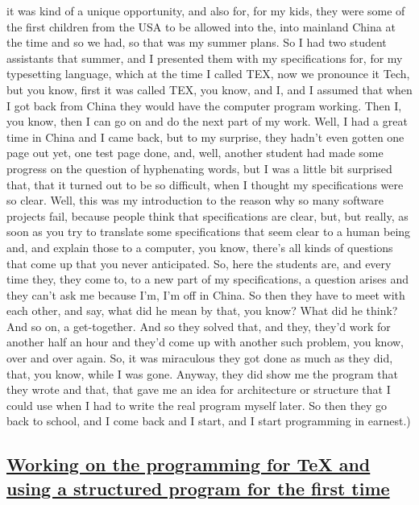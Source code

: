 \documentclass[]{article}
\begin{document}
it was kind of a unique opportunity, and also for, for my kids, they
were some of the first children from the USA to be allowed into the,
into mainland China at the time and so we had, so that was my summer
plans. So I had two student assistants that summer, and I presented them
with my specifications for, for my typesetting language, which at the
time I called TEX, now we pronounce it Tech, but you know, first it was
called TEX, you know, and I, and I assumed that when I got back from
China they would have the computer program working. Then I, you know,
then I can go on and do the next part of my work. Well, I had a great
time in China and I came back, but to my surprise, they hadn't even
gotten one page out yet, one test page done, and, well, another student
had made some progress on the question of hyphenating words, but I was a
little bit surprised that, that it turned out to be so difficult, when I
thought my specifications were so clear. Well, this was my introduction
to the reason why so many software projects fail, because people think
that specifications are clear, but, but really, as soon as you try to
translate some specifications that seem clear to a human being and, and
explain those to a computer, you know, there's all kinds of questions
that come up that you never anticipated. So, here the students are, and
every time they, they come to, to a new part of my specifications, a
question arises and they can't ask me because I'm, I'm off in China. So
then they have to meet with each other, and say, what did he mean by
that, you know? What did he think? And so on, a get-together. And so
they solved that, and they, they'd work for another half an hour and
they'd come up with another such problem, you know, over and over again.
So, it was miraculous they got done as much as they did, that, you know,
while I was gone. Anyway, they did show me the program that they wrote
and that, that gave me an idea for architecture or structure that I
could use when I had to write the real program myself later. So then
they go back to school, and I come back and I start, and I start
programming in earnest.)

\subsection{\texorpdfstring{\href{http://webofstories.com/play/17116}{Working
on the programming for TeX and using a structured program for the first
time}}{Working on the programming for TeX and using a structured program for the first time}}\label{working-on-the-programming-for-tex-and-using-a-structured-program-for-the-first-time}
\end{document}
